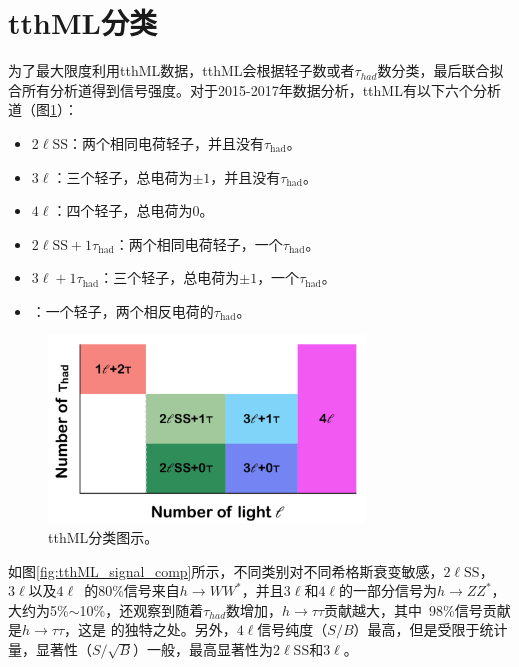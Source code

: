 \section{tthML分类}
为了最大限度利用tthML数据，tthML会根据轻子数或者$\tau_{had}$数分类，最后联合拟合所有分析道得到信号强度。对于2015-2017年数据分析，tthML有以下六个分析道（图\ref{fig:tthML_cates}）：
\begin{itemize}
 \item $2\ell\text{SS}$：两个相同电荷轻子，并且没有$\tau_{\text{had}}$。
 \item $3\ell$：三个轻子，总电荷为$\pm1$，并且没有$\tau_{\text{had}}$。
 \item $4\ell$：四个轻子，总电荷为0。
 \item $2\ell\text{SS}+1\tau_{\text{had}}$：两个相同电荷轻子，一个$\tau_{\text{had}}$。
 \item $3\ell+1\tau_{\text{had}}$：三个轻子，总电荷为$\pm1$，一个$\tau_{\text{had}}$。
 \item \ltwotau ：一个轻子，两个相反电荷的$\tau_{\text{had}}$。
\end{itemize}
\begin{figure}[h]
\centering
 \includegraphics[width=0.75\textwidth]{fig/tthML_cates.png}
 \caption{tthML分类图示。}
 \label{fig:tthML_cates}
\end{figure}
如图\ref{fig:tthML_signal_comp}所示，不同类别对不同希格斯衰变敏感，$2\ell\text{SS}$，$3\ell$以及$4\ell$~的80\%信号来自$h\rightarrow WW^*$，并且$3\ell$和$4\ell$的一部分信号为$h\rightarrow ZZ^*$，大约为5\%$\sim$10\%，还观察到随着$\tau_{had}$数增加，$h\rightarrow \tau\tau$贡献越大，其中\ltwotau ~98\%信号贡献是$h\rightarrow \tau\tau$，这是
\ltwotau 的独特之处。另外，$4\ell$信号纯度（$S/B$）最高，但是受限于统计量，显著性（$S/\sqrt{B}$）一般，最高显著性为$2\ell\text{SS}$和$3\ell$。
